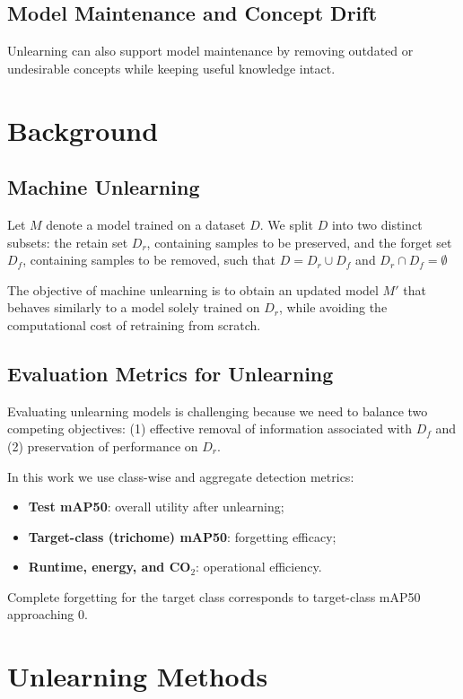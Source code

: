 \documentclass[conference]{IEEEtran}
\begin{document}
\subsection{Model Maintenance and Concept Drift}
Unlearning can also support model maintenance by removing outdated or undesirable concepts while keeping useful knowledge intact.


\section{\textbf{Background}}

\subsection{Machine Unlearning} Let \(M\) denote a model trained on a dataset \(D\). We split \(D\) into two distinct subsets: the retain set \(D_r\), containing samples to be preserved, and the forget set \(D_f\), containing samples to be removed, such that \(D = D_r \cup D_f\) and \(D_r \cap D_f = \emptyset\)

The objective of machine unlearning is to obtain an updated model \(M'\) that behaves similarly to a model solely trained on \(D_r\), while avoiding the computational cost of retraining from scratch.

\subsection{Evaluation Metrics for Unlearning} Evaluating unlearning models is challenging because we need to balance two competing objectives: (1) effective removal of information associated with \(D_f\) and (2) preservation of performance on \(D_r\).

In this work we use class-wise and aggregate detection metrics:
\begin{itemize}
    \item \textbf{Test mAP50}: overall utility after unlearning;
    \item \textbf{Target-class (trichome) mAP50}: forgetting efficacy;
    \item \textbf{Runtime, energy, and CO\(_2\)}: operational efficiency.
\end{itemize}

Complete forgetting for the target class corresponds to target-class mAP50 approaching 0.


\section{\textbf{Unlearning Methods}}
\end{document}
